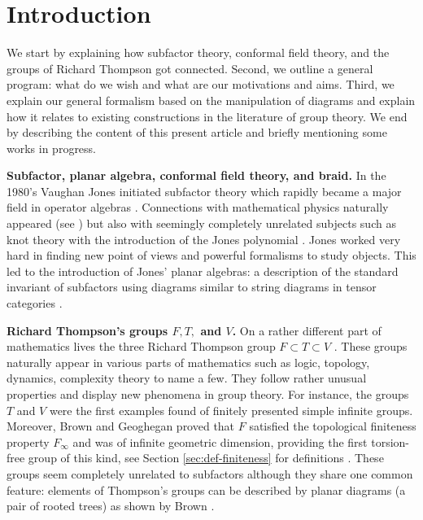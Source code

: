 \documentclass[a4paper, 12pt]{amsart}
\numberwithin{equation}{section}
\theoremstyle{definition}
\begin{document}
\tableofcontents


\section*{Introduction}
We start by explaining how subfactor theory, conformal field theory, and the groups of Richard Thompson got connected. Second, we outline a general program: what do we wish and what are our motivations and aims. Third, we explain our general formalism based on the manipulation of diagrams and explain how it relates to existing constructions in the literature of group theory. We end by describing the content of this present article and briefly mentioning some works in progress.

{\bf Subfactor, planar algebra, conformal field theory, and braid.}
In the 1980's Vaughan Jones initiated subfactor theory which rapidly became a major field in operator algebras \cite{Jones83}.
Connections with mathematical physics naturally appeared (see \cite{Evans-Kawahigashi92, Kawahigashi18-ICM,Evans22}) but also with seemingly completely unrelated subjects such as knot theory with the introduction of the Jones polynomial \cite{Jones85,Jones87}.
Jones worked very hard in finding new point of views and powerful formalisms to study objects. 
This led to the introduction of Jones' planar algebras: a description of the standard invariant of subfactors using diagrams similar to string diagrams in tensor categories \cite{Jones99}.

{\bf Richard Thompson's groups $F,T,$ and $V$.}
On a rather different part of mathematics lives the three Richard Thompson group $F\subset T\subset V$ \cite{Cannon-Floyd-Parry96}.
These groups naturally appear in various parts of mathematics such as logic, topology, dynamics, complexity theory to name a few.
They follow rather unusual properties and display new phenomena in group theory.
For instance, the groups $T$ and $V$ were the first examples found of finitely presented simple infinite groups. 
Moreover, Brown and Geoghegan proved that $F$ satisfied the topological finiteness property $F_\infty$ and was of infinite geometric dimension, providing the first torsion-free group of this kind, see Section \ref{sec:def-finiteness} for definitions \cite{Brown-Geoghegan84}.
These groups seem completely unrelated to subfactors although they share one common feature: elements of Thompson's groups can be described by planar diagrams (a pair of rooted trees) as shown by Brown \cite{Brown87}.
\end{document}
